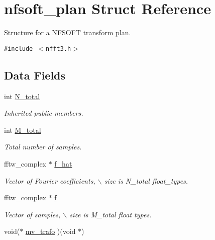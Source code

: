 \hypertarget{structnfsoft__plan}{
\section{nfsoft\_\-plan Struct Reference}
\label{structnfsoft__plan}
}
Structure for a NFSOFT transform plan.  


{\tt \#include $<$nfft3.h$>$}

\subsection*{Data Fields}
\begin{CompactItemize}
\item 
int \hyperlink{structnfsoft__plan_2f54052e48b3c46b98898e768f0f9350}{N\_\-total}
\begin{CompactList}\small\item\em Inherited public members. \item\end{CompactList}\item 
\hypertarget{structnfsoft__plan_549fec5b758aee2a846b1025f5875799}{
int \hyperlink{structnfsoft__plan_549fec5b758aee2a846b1025f5875799}{M\_\-total}}
\label{structnfsoft__plan_549fec5b758aee2a846b1025f5875799}

\begin{CompactList}\small\item\em Total number of samples. \item\end{CompactList}\item 
\hypertarget{structnfsoft__plan_8ebb50336db1a16d7d3c148846f3b464}{
fftw\_\-complex $\ast$ \hyperlink{structnfsoft__plan_8ebb50336db1a16d7d3c148846f3b464}{f\_\-hat}}
\label{structnfsoft__plan_8ebb50336db1a16d7d3c148846f3b464}

\begin{CompactList}\small\item\em Vector of Fourier coefficients, $\backslash$ size is N\_\-total float\_\-types. \item\end{CompactList}\item 
\hypertarget{structnfsoft__plan_50bbe0671c97b378973ca31d634916a3}{
fftw\_\-complex $\ast$ \hyperlink{structnfsoft__plan_50bbe0671c97b378973ca31d634916a3}{f}}
\label{structnfsoft__plan_50bbe0671c97b378973ca31d634916a3}

\begin{CompactList}\small\item\em Vector of samples, $\backslash$ size is M\_\-total float types. \item\end{CompactList}\item 
\hypertarget{structnfsoft__plan_39c0c7e5bb34d19f758c7fc97bd087b7}{
void($\ast$ \hyperlink{structnfsoft__plan_39c0c7e5bb34d19f758c7fc97bd087b7}{mv\_\-trafo} )(void $\ast$)}
\label{structnfsoft__plan_39c0c7e5bb34d19f758c7fc97bd087b7}


\end{CompactItemize}

